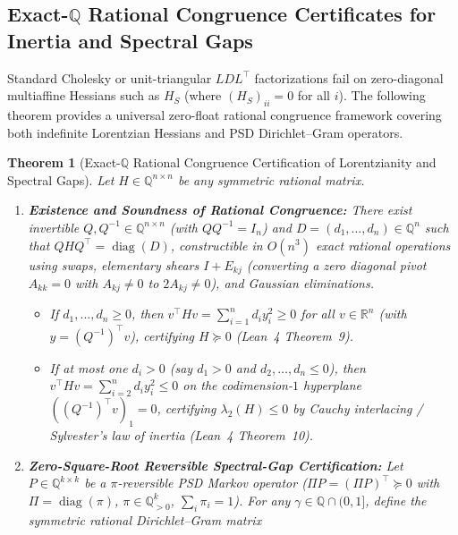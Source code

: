 \documentclass[11pt,a4paper]{article}
\newtheorem{theorem}{Theorem}[section]
\theoremstyle{definition}
\theoremstyle{remark}
\newcommand{\QQ}{\mathbb{Q}}
\newcommand{\RR}{\mathbb{R}}
\newcommand{\diag}{\operatorname{diag}}
\begin{document}
\subsection{Exact-\texorpdfstring{$\QQ$}{Q} Rational Congruence Certificates for Inertia and Spectral Gaps}

Standard Cholesky or unit-triangular $LDL^\top$ factorizations fail on zero-diagonal multiaffine Hessians such as $H_S$ (where $(H_S)_{ii} = 0$ for all $i$). The following theorem provides a universal zero-float rational congruence framework covering both indefinite Lorentzian Hessians and PSD Dirichlet--Gram operators.

\begin{theorem}[Exact-$\QQ$ Rational Congruence Certification of Lorentzianity and Spectral Gaps]\label{thm:congruence}
Let $H \in \QQ^{n\times n}$ be any symmetric rational matrix.
\begin{enumerate}[leftmargin=1.8em,itemsep=2pt]
  \item \textbf{Existence and Soundness of Rational Congruence:} There exist invertible $Q, Q^{-1} \in \QQ^{n\times n}$ (with $Q Q^{-1} = I_n$) and $D = (d_1,\dots,d_n) \in \QQ^n$ such that $Q H Q^\top = \diag(D)$, constructible in $O(n^3)$ exact rational operations using swaps, elementary shears $I + E_{kj}$ (converting a zero diagonal pivot $A_{kk}=0$ with $A_{kj}\neq 0$ to $2A_{kj}\neq 0$), and Gaussian eliminations.
  \begin{itemize}[leftmargin=1.4em,itemsep=1pt]
    \item If $d_1, \dots, d_n \ge 0$, then $v^\top H v = \sum_{i=1}^n d_i y_i^2 \ge 0$ for all $v \in \RR^n$ (with $y = (Q^{-1})^\top v$), certifying $H \succeq 0$ (Lean~4 Theorem~9).
    \item If at most one $d_i > 0$ (say $d_1 > 0$ and $d_2, \dots, d_n \le 0$), then $v^\top H v = \sum_{i=2}^n d_i y_i^2 \le 0$ on the codimension-$1$ hyperplane $((Q^{-1})^\top v)_1 = 0$, certifying $\lambda_2(H) \le 0$ by Cauchy interlacing / Sylvester's law of inertia (Lean~4 Theorem~10).
  \end{itemize}
  \item \textbf{Zero-Square-Root Reversible Spectral-Gap Certification:} Let $P \in \QQ^{k\times k}$ be a $\pi$-reversible PSD Markov operator ($\Pi P = (\Pi P)^\top \succeq 0$ with $\Pi = \diag(\pi)$, $\pi \in \QQ_{>0}^k$, $\sum_i \pi_i = 1$). For any $\gamma \in \QQ \cap (0, 1]$, define the symmetric rational Dirichlet--Gram matrix
  \begin{equation}\label{eq:dirichlet-gram}

\end{equation}
\end{enumerate}
\end{theorem}
\end{document}
